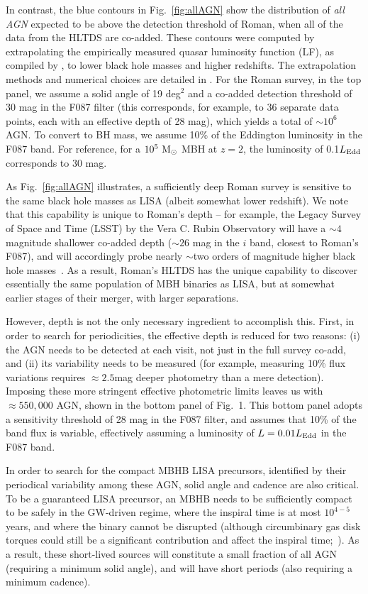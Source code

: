 \documentclass[tightenlines,superscriptaddress,amsmath,amssymb,prl,12pt]{revtex4-1}
\newcommand{\msun}{{\rm M}_\odot}
\begin{document}
In contrast, the blue contours in Fig.~\ref{fig:allAGN} show the
distribution of {\it all AGN} expected to be above the detection
threshold of Roman, when all of the data from the HLTDS are co-added.
These contours were computed by extrapolating the empirically measured
quasar luminosity function (LF), as compiled by \cite{Kulkarni2019},
to lower black hole masses and higher redshifts.  The extrapolation
methods and numerical choices are detailed in \cite{Xin+2021}.  For
the Roman survey, in the top panel, we assume a solid angle of 19
deg$^2$ and a co-added detection threshold of 30 mag in the F087
filter (this corresponds, for example, to 36 separate data points,
each with an effective depth of 28 mag), which yields a total of $\sim
10^6$ AGN.  To convert to BH mass, we assume 10\% of the Eddington
luminosity in the F087 band.  For reference, for a $10^5~\msun$ MBH at
$z=2$, the luminosity of 0.1$L_{\rm Edd}$ corresponds to 30 mag.

As Fig.~\ref{fig:allAGN} illustrates, a sufficiently deep Roman survey
is sensitive to the same black hole masses as LISA (albeit somewhat
lower redshift). We note that this capability is unique to Roman's
depth -- for example, the Legacy Survey of Space and Time (LSST) by
the Vera C. Rubin Observatory will have a $\sim 4$ magnitude shallower
co-added depth ($\sim 26$ mag in the $i$ band, closest to Roman's
F087), and will accordingly probe nearly $\sim$two orders of magnitude
higher black hole masses~\cite{Ivezic2019}.  As a result, Roman's
HLTDS has the unique capability to discover essentially the same
population of MBH binaries as LISA, but at somewhat earlier stages of
their merger, with larger separations.


However, depth is not the only necessary ingredient to accomplish
this.  First, in order to search for periodicities, the effective
depth is reduced for two reasons: (i) the AGN needs to be detected at
each visit, not just in the full survey co-add, and (ii) its
variability needs to be measured (for example, measuring 10\% flux
variations requires $\approx 2.5$mag deeper photometry than a mere
detection).  Imposing these more stringent effective photometric
limits leaves us with $\approx 550,000$ AGN, shown in the bottom panel
of Fig.~1. This bottom panel adopts a sensitivity threshold of 28 mag
in the F087 filter, and assumes that 10\% of the band flux is
variable, effectively assuming a luminosity of $L=0.01L_{\rm Edd}$ in
the F087 band.

In order to search for the compact MBHB LISA precursors, identified by
their periodical variability among these AGN, solid angle and cadence
are also critical. To be a guaranteed LISA precursor, an MBHB needs to
be sufficiently compact to be safely in the GW-driven regime, where
the inspiral time is at most $10^{4-5}$ years, and where the binary
cannot be disrupted (although circumbinary gas disk torques could
still be a significant contribution and affect the inspiral
time;~\cite{Haiman+2009}). As a result, these short-lived sources will
constitute a small fraction of all AGN (requiring a minimum solid
angle), and will have short periods (also requiring a minimum
cadence).
\end{document}

